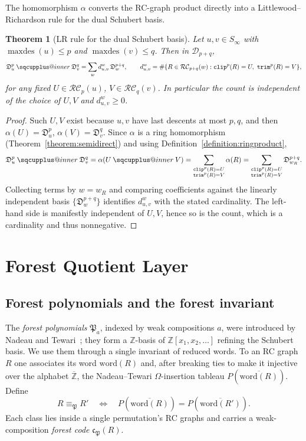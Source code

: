 \documentclass{amsart}
\makeatletter
\newtheorem{theorem}{Theorem}[section]
\theoremstyle{definition}
\theoremstyle{remark}
\newcommand{\RC}{\mathcal{RC}}
\newcommand{\dcoma}{\mathcal{D}}
\newcommand{\forest}{\mathfrak{P}}
\newcommand{\dsch}{\mathfrak{D}}
\newcommand{\code}{\mathfrak{c}}
\newcommand{\wof}[1]{w_{#1}}
\newcommand{\maxd}{\operatorname{maxdes}}
\newcommand{\trm}{\mathtt{trim}}
\newcommand{\clp}{\mathtt{clip}}
\newcommand{\sqcupplus@inner}[2]{%
  \vcenter{\hbox{\ooalign{%
    \hfil$\m@th#1\sqcup$\hfil\cr
    \hfil\raisebox{0.15ex}{$\m@th#1\scriptscriptstyle+$}\hfil\cr
  }}}%
}
\newcommand{\sqcupplus}{\mathbin{\mathpalette\sqcupplus@inner\relax}}
\makeatother
\begin{document}
The homomorphism $\alpha$ converts the RC-graph product directly into a Littlewood--Richardson rule for the dual Schubert basis.

\begin{theorem}[LR rule for the dual Schubert basis]\label{theorem:LR}
Let $u,v\in S_\infty$ with $\maxd(u)\leq p$ and $\maxd(v)\leq q$. Then in $\dcoma_{p+q}$,
\[
\dsch_u^p\sqcupplus\dsch_v^q=\sum_w d_{u,v}^w\,\dsch_w^{p+q},\qquad
d_{u,v}^w=\#\{R\in\RC_{p+q}(w):\clp^p(R)=U,\ \trm^p(R)=V\},
\]
for any fixed $U\in\RC_p(u)$, $V\in\RC_q(v)$. In particular the count is independent of the choice of $U,V$ and $d_{u,v}^w\geq 0$.
\end{theorem}
\begin{proof}
Such $U,V$ exist because $u,v$ have last descents at most $p,q$, and then $\alpha(U)=\dsch_u^p$, $\alpha(V)=\dsch_v^q$. Since $\alpha$ is a ring homomorphism (Theorem~\ref{theorem:semidirect}) and using Definition~\ref{definition:ringproduct},
\[
\dsch_u^p\sqcupplus\dsch_v^q=\alpha(U\sqcupplus V)=\sum_{\substack{\clp^p(R)=U\\\trm^p(R)=V}}\alpha(R)=\sum_{\substack{\clp^p(R)=U\\\trm^p(R)=V}}\dsch_{\wof{R}}^{p+q}.
\]
Collecting terms by $w=\wof{R}$ and comparing coefficients against the linearly independent basis $\{\dsch_w^{p+q}\}$ identifies $d_{u,v}^w$ with the stated cardinality. The left-hand side is manifestly independent of $U,V$, hence so is the count, which is a cardinality and thus nonnegative.
\end{proof}

\section{Forest Quotient Layer}

\subsection{Forest polynomials and the forest invariant}

The \emph{forest polynomials} $\forest_a$, indexed by weak compositions $a$, were introduced by Nadeau and Tewari~\cite{nadeau2024forest}; they form a $\mathbb{Z}$-basis of $\mathbb{Z}[x_1,x_2,\ldots]$ refining the Schubert basis. We use them through a single invariant of reduced words. To an RC graph $R$ one associates its word $\mathrm{word}(R)$ and, after breaking ties to make it injective over the alphabet $\overline{\mathbb{Z}}$, the Nadeau--Tewari $\Omega$-insertion tableau $P(\overline{\mathrm{word}(R)})$. Define
\[
R\equiv_{\forest}R'\quad\Longleftrightarrow\quad P(\overline{\mathrm{word}(R)})=P(\overline{\mathrm{word}(R')}).
\]
Each class lies inside a single permutation's RC graphs and carries a weak-composition \emph{forest code} $\code_{\forest}(R)$.
\end{document}
